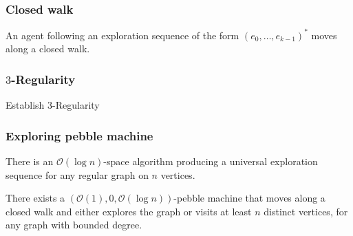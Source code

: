 \documentclass{beamer}
\begin{document}
\begin{frame}
  \frametitle{Closed walk}
  \begin{mdframed}[linecolor=magenta]
    \begin{lemma}
      An agent following an exploration sequence of the form
      $(e_{0},\dots,e_{k-1})^{\ast}$ moves along a closed walk.
    \end{lemma}
  \end{mdframed}
\end{frame}

\begin{frame}
  \frametitle{$3$-Regularity}
  \begin{mdframed}[linecolor=purple]
    Establish $3$-Regularity
  \end{mdframed}
  \begin{center}
  \end{center}
\end{frame}

\begin{frame}
  \frametitle{Exploring pebble machine}
  \begin{mdframed}
    \begin{theorem}[Reingold]
      There is an $\mathcal{O}(\log n)$-space algorithm producing a universal
      exploration sequence for any regular graph on $n$ vertices.
    \end{theorem}
  \end{mdframed}
  \begin{center}
  \end{center}
  \begin{mdframed}
    \begin{theorem}
      There exists a $(\mathcal{O}(1), 0, \mathcal{O}(\log n))$-pebble machine
      that moves along a closed walk and either explores the graph or visits at
      least $n$ distinct vertices, for any graph with bounded degree.
    \end{theorem}
  \end{mdframed}
\end{frame}
\end{document}
